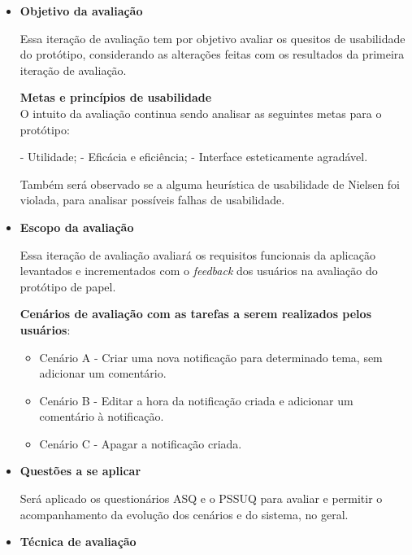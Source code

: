 	  \begin{itemize}
	   \item \textbf{Objetivo da avaliação}
	      
	      \subitem Essa iteração de avaliação tem por objetivo avaliar os quesitos de usabilidade do protótipo, considerando as
	      alterações feitas com os resultados da primeira iteração de avaliação.
	      
	      \subitem \textbf{Metas e princípios de usabilidade}\\
		O intuito da avaliação continua sendo analisar as seguintes metas para o protótipo:
		
		\subsubitem - Utilidade;
		\subsubitem - Eficácia e eficiência;
		\subsubitem - Interface esteticamente agradável.
		
	      Também será observado se a alguma heurística de usabilidade de Nielsen foi violada, para analisar possíveis 
	      falhas de usabilidade.
	    
	   \item \textbf{Escopo da avaliação}
	      
	      \subitem Essa iteração de avaliação avaliará os requisitos funcionais da aplicação levantados e incrementados
	       com o \textit{feedback} dos usuários na avaliação do protótipo de papel.
	      
	      \subitem \textbf{Cenários de avaliação com as tarefas a serem realizados pelos usuários}:
		
		\begin{itemize}
		  \item Cenário A - Criar uma nova notificação para determinado tema, sem adicionar um comentário.

		  \item Cenário B - Editar a hora da notificação criada e adicionar um comentário à notificação.
		    
		  \item Cenário C - Apagar a notificação criada.
		  
		\end{itemize}

	   \item \textbf{Questões a se aplicar}
	      
	      \subitem Será aplicado os questionários ASQ e o PSSUQ para avaliar e permitir o acompanhamento
		da evolução dos cenários e do sistema, no geral.
	      
	   \item \textbf{Técnica de avaliação}
	      

\end{itemize}
